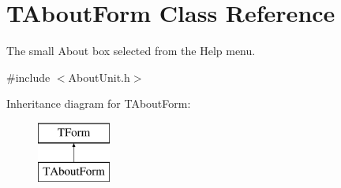 \hypertarget{class_t_about_form}{}\section{T\+About\+Form Class Reference}
\label{class_t_about_form}


The small \textquotesingle{}About\textquotesingle{} box selected from the Help menu.  




{\ttfamily \#include $<$About\+Unit.\+h$>$}

Inheritance diagram for T\+About\+Form\+:\begin{figure}[H]
\begin{center}
\leavevmode
\includegraphics[height=2.000000cm]{class_t_about_form}
\end{center}
\end{figure}
